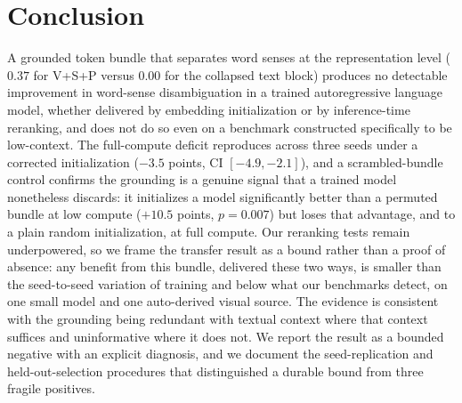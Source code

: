 \documentclass[twoside,11pt]{article}
\begin{document}
\section{Conclusion}

A grounded token bundle that separates word senses at the representation level ($0.37$ for V+S+P versus $0.00$ for the collapsed text block) produces no detectable improvement in word-sense disambiguation in a trained autoregressive language model, whether delivered by embedding initialization or by inference-time reranking, and does not do so even on a benchmark constructed specifically to be low-context. The full-compute deficit reproduces across three seeds under a corrected initialization ($-3.5$ points, CI $[-4.9, -2.1]$), and a scrambled-bundle control confirms the grounding is a genuine signal that a trained model nonetheless discards: it initializes a model significantly better than a permuted bundle at low compute ($+10.5$ points, $p = 0.007$) but loses that advantage, and to a plain random initialization, at full compute. Our reranking tests remain underpowered, so we frame the transfer result as a bound rather than a proof of absence: any benefit from this bundle, delivered these two ways, is smaller than the seed-to-seed variation of training and below what our benchmarks detect, on one small model and one auto-derived visual source. The evidence is consistent with the grounding being redundant with textual context where that context suffices and uninformative where it does not. We report the result as a bounded negative with an explicit diagnosis, and we document the seed-replication and held-out-selection procedures that distinguished a durable bound from three fragile positives.

\end{document}
